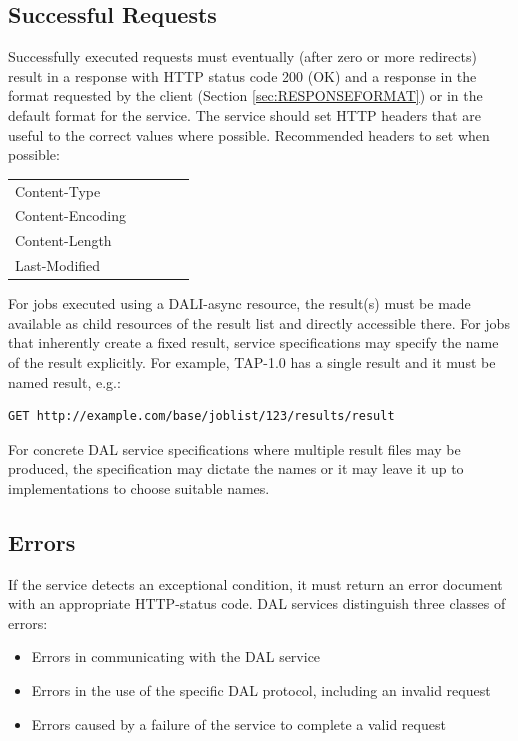 \documentclass[11pt,letter]{ivoa}
\begin{document}
\subsection{Successful Requests}
\label{sec:response-ok}
Successfully executed requests must eventually (after zero or more redirects) 
result in a response with HTTP status code 200 (OK) and a response in the format 
requested by the client (Section \ref{sec:RESPONSEFORMAT}) or in the default format for the 
service. The service should set HTTP headers \citep{std:HTTP} that are useful to the correct values 
where possible. Recommended headers to set when possible:

\begin{tabular}{l l l l l}
\label{tab:headers}
Content-Type \\
Content-Encoding \\
Content-Length \\
Last-Modified \\
\end{tabular}

For jobs executed using a DALI-async resource, the result(s) must be made 
available as child resources of the result list and directly accessible there. 
For jobs that inherently create a fixed result, service specifications may 
specify the name of the result explicitly. For example, TAP-1.0 has a single 
result and it must be named result, e.g.:

\begin{verbatim}
GET http://example.com/base/joblist/123/results/result
\end{verbatim}

For concrete DAL service specifications where multiple result files may be 
produced, the specification may dictate the names or it may leave it up to 
implementations to choose suitable names.

\subsection{Errors}
\label{sec:response-error}
If the service detects an exceptional condition, it must return an error 
document with an appropriate HTTP-status code. DAL services distinguish three 
classes of errors:

\begin{itemize}
\item Errors in communicating with the DAL service 

\item Errors in the use of the specific DAL protocol, including an invalid 
request 

\item Errors caused by a failure of the service to complete a valid request 
\end{itemize}
\end{document}
